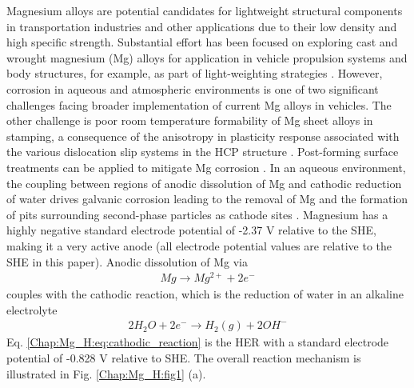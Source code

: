 Magnesium alloys are potential candidates for lightweight structural components in transportation industries and other applications due to their low density and high specific strength. Substantial effort has been focused on exploring cast and wrought magnesium (Mg) alloys for application in vehicle propulsion systems and body structures, for example, as part of light-weighting strategies \cite{luo2005development, luo2006wrought,carter2011structural, jekl2015development, luo2013magnesium}. However, corrosion in aqueous and atmospheric environments is one of two significant challenges facing broader implementation of current Mg alloys in vehicles. The other challenge is poor room temperature formability of Mg sheet alloys in stamping, a consequence of the anisotropy in plasticity response associated with the various dislocation slip systems in the \ac{HCP} structure \cite{yasi2010first}. Post-forming surface treatments can be applied to mitigate Mg corrosion \cite{zheng2005corrosion}.
In an aqueous environment, the coupling between regions of anodic dissolution of Mg and cathodic reduction of water drives galvanic corrosion leading to the removal of Mg and the formation of pits surrounding second-phase particles as cathode sites \cite{birbilis2014evidence, zeng2006review}. Magnesium has a highly negative standard electrode potential of -2.37 V relative to the \ac{SHE}, making it a very active anode (all electrode potential values are relative to the \ac{SHE} in this paper). Anodic dissolution of Mg via
\begin{align}
Mg \rightarrow Mg^{2+} + 2e^{-}
 \label{Chap:Mg_H:eq:anodic_dissolution}
\end{align}
couples with the cathodic reaction, which is the reduction of water in an alkaline electrolyte
\begin{align}
2H_2O + 2e^{-} \rightarrow H_{2}(g) + 2OH^{-}
 \label{Chap:Mg_H:eq:cathodic_reaction}
\end{align}
Eq. \ref{Chap:Mg_H:eq:cathodic_reaction} is the \ac{HER} with a standard electrode potential of -0.828 V relative to \ac{SHE}. The overall reaction mechanism is illustrated in Fig. \ref{Chap:Mg_H:fig1} (a).


